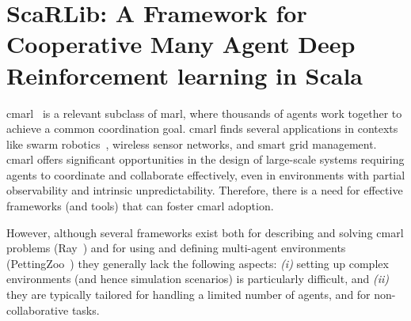 %

%
%
%
%
\chapter[ScaRLib]{ScaRLib: A Framework for Cooperative Many Agent Deep Reinforcement learning in Scala}%
%
\minitoc%
%

\Ac{cmarl}~\cite{yang2021many,https://doi.org/10.48550/arxiv.2106.09825}
 is a relevant subclass of \ac{marl}, 
 where thousands of agents work together to achieve a common coordination goal. 
\ac{cmarl} finds several applications in contexts like swarm robotics~\cite{huttenrauch2019deep}, wireless sensor networks, and smart grid management. 
%
\ac{cmarl} offers significant opportunities in the design of large-scale systems
 requiring agents to coordinate and collaborate effectively, 
 even in environments with partial observability and intrinsic unpredictability. 
%
Therefore, there is a need for effective frameworks (and tools) that can foster \ac{cmarl} adoption.

% 
However, although several frameworks exist both for describing and solving \ac{cmarl} problems (Ray~\cite{ray}) 
and for using and defining multi-agent environments (PettingZoo~\cite{NEURIPS2021_7ed2d345}) 
they generally lack the following aspects: \emph{(i)} setting up complex environments (and hence simulation scenarios) is particularly difficult, and 
\emph{(ii)} they are typically tailored for handling a limited number of agents, and for non-collaborative tasks.

